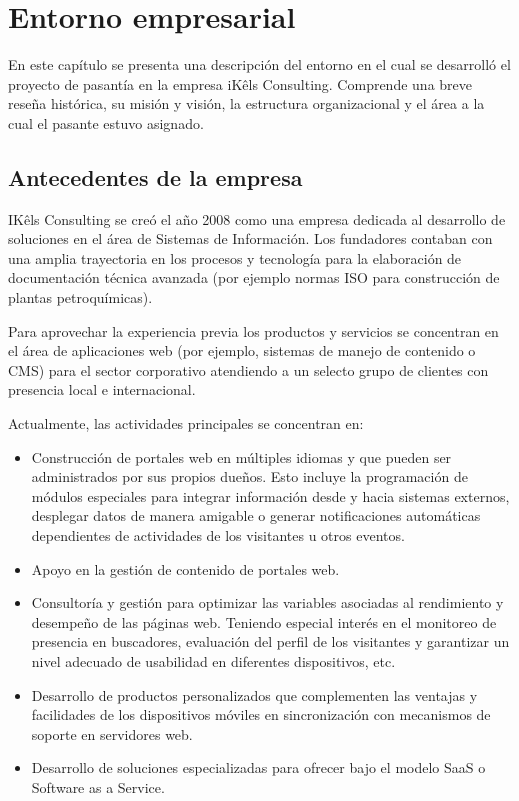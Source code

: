 \chapter{Entorno empresarial}
En este capítulo se presenta una descripción del entorno en el cual se desarrolló el proyecto de pasantía en la empresa iKêls Consulting. Comprende una breve reseña histórica, su misión y visión, la estructura organizacional y el área a la cual el pasante estuvo asignado.

\section{Antecedentes de la empresa}
IKêls Consulting se creó el año 2008 como una empresa dedicada al desarrollo de soluciones en el área de Sistemas de Información. Los fundadores contaban con una amplia trayectoria en los procesos y tecnología para la elaboración de documentación técnica avanzada (por ejemplo normas ISO para construcción de plantas petroquímicas).

Para aprovechar la experiencia previa los productos y servicios se concentran en el área de aplicaciones web (por ejemplo, sistemas de manejo de contenido o CMS) para el sector corporativo atendiendo a un selecto grupo de clientes con presencia local e internacional.

Actualmente, las actividades principales se concentran en:

\begin{itemize}
  \item Construcción de portales web en múltiples idiomas y que pueden ser administrados por sus propios dueños. Esto incluye la programación de módulos especiales para integrar información desde y hacia sistemas externos, desplegar datos de manera amigable o generar notificaciones automáticas dependientes de actividades de los visitantes u otros eventos.
  \item Apoyo en la gestión de contenido de portales web.
  \item Consultoría y gestión para optimizar las variables asociadas al rendimiento y desempeño de las páginas web. Teniendo especial interés en el monitoreo de presencia en buscadores, evaluación del perfil de los visitantes y garantizar un nivel adecuado de usabilidad en diferentes dispositivos, etc.
  \item Desarrollo de productos personalizados que complementen las ventajas y facilidades de los dispositivos móviles en sincronización con mecanismos de soporte en servidores web.
  \item Desarrollo de soluciones especializadas para ofrecer bajo el modelo SaaS o Software as a Service.
\end{itemize}

